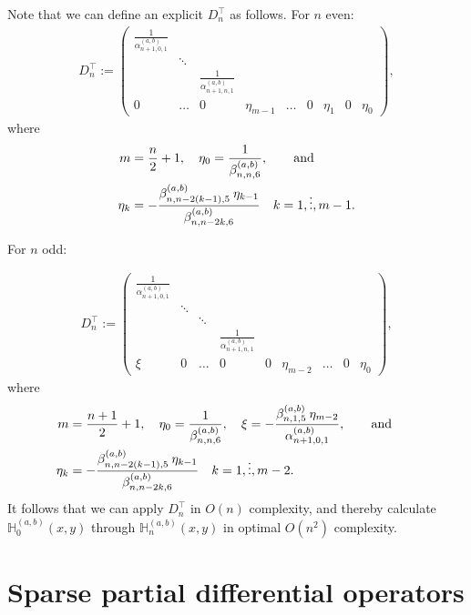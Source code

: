 \documentclass[11pt, oneside]{article}   	%
\newcommand{\hdop}{H}
\newcommand{\bighdop}{\mathbb{\hdop}}
\newcommand{\alphaab}{\alpha^{(a,b)}}
\newcommand{\betaab}{\beta^{(a,b)}}
\newcommand{\bighdopab}{\bighdop^{(a,b)}}
\newcommand{\Dnt}{D^\top_n}
\begin{document}
Note that we can define an explicit \(\Dnt\) as follows. For \(n\) even:
\begin{align*}
\Dnt := \begin{pmatrix}
		\frac{1}{\alphaab_{n+1,0,1}} & & &  \\
		& \ddots & & & \\
		& & \frac{1}{\alphaab_{n+1,n,1}} & \\
		0 & \hdots & 0 & \eta_{m-1} & \hdots & 0 & \eta_1 & 0 & \eta_0
	    \end{pmatrix},
\end{align*}
where
\begin{align*}
m &= \frac{n}{2} + 1, \quad \eta_0 = \frac{1}{\betaab_{n,n,6}},\qqand \nonumber \\
\eta_k &= -\frac{\betaab_{n,n-2(k-1),5} \: \eta_{k-1}}{\betaab_{n,n-2k,6}} \quad k = 1,\dots,m-1.
\end{align*}

For \(n\) odd:

\begin{align*}
\Dnt := \begin{pmatrix}
		\frac{1}{\alphaab_{n+1,0,1}} & &  \\
		& \ddots & & &  \\
		& & \ddots & & \\
		& & & \frac{1}{\alphaab_{n+1,n,1}} & \\
		\xi & 0 & \hdots & 0 & 0 & \eta_{m-2} & \hdots & 0 & \eta_0
	    \end{pmatrix},
\end{align*}
 where
\begin{align*}
m &= \frac{n+1}{2} + 1,\quad  \eta_0 = \frac{1}{\betaab_{n,n,6}}, \quad \xi = -\frac{\betaab_{n,1,5} \: \eta_{m-2}}{\alphaab_{n+1,0,1}},\qqand \nonumber \\
\eta_k &= -\frac{\betaab_{n,n-2(k-1),5} \: \eta_{k-1}}{\betaab_{n,n-2k,6}} \quad k = 1,\dots,m-2.
\end{align*}
It follows that we can apply $\Dnt$ in $O(n)$ complexity, and thereby calculate $\bighdopab_{0}(x,y)$  through $\bighdopab_{n}(x,y)$ in optimal $O(n^2)$ complexity.

%
\section{Sparse partial differential operators}\label{Section:PDOs}
\end{document}
